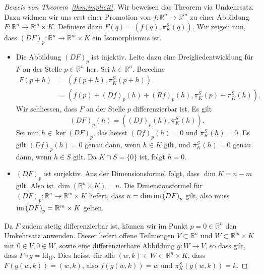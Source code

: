 \documentclass[../main.tex]{subfiles}
\begin{document}
\begin{proof}[Beweis von Theorem~\ref{thm:implicit}]
  Wir beweisen das Theorem via Umkehrsatz.
  Dazu widmen wir uns erst einer Promotion
  von $f \colon \mathbb{R}^n \to \mathbb{R}^m$ 
  zu einer Abbildung
  $F \colon \mathbb{R}^n \to \mathbb{R}^m \times K$.
  Definiere dazu $F(q) = (f(q), \pi_K^S(q))$.
  Wir zeigen nun, dass ${(DF)}_p \colon \mathbb{R}^n \to
  \mathbb{R}^m \times K$ 
  ein Isomorphismus ist.
  \begin{itemize}
    \item Die Abbildung ${(DF)}_p$
      ist injektiv.
      Leite dazu eine Dreigliedentwicklung für $F$ an
      der Stelle $p \in \mathbb{R}^n$ her.
      Sei $h \in \mathbb{R}^n$.
      Berechne
      \begin{align*}
        F(p+h)
        & = (f(p + h), \pi_K^S(p + h)) \\
        &= (f(p) + {(Df)}_p(h) + {(Rf)}_p(h), \pi_K^S(p) + \pi_K^S(h)).
      \end{align*}
      Wir schliessen, dass $F$
      an der Stelle  $p$ differenzierbar ist.
      Es gilt \[{(DF)}_p(h) = ({(Df)}_p(h), \pi_K^S(h)).\]
      Sei nun $h \in \ker {(DF)}_p$, das heisst
      ${(Df)}_p(h) = 0$ und $\pi_K^S(h) = 0$.
      Es gilt ${(Df)}_p(h) = 0$ genau dann,
      wenn $h \in K$ gilt, und $\pi_K^S(h) = 0$ genau dann,
      wenn $h \in S$ gilt. Da $K \cap S = \{0\}$ ist, folgt $h = 0$.
    \item ${(DF)}_p$ ist surjektiv.
      Aus der Dimensionsformel folgt, dass $\dim K = n - m$ gilt.
      Also ist $\dim (\mathbb{R}^n \times K) = n$.
      Die Dimensionsformel für 
      ${(DF)}_p \colon \mathbb{R}^n \to \mathbb{R}^m \times K$ 
      liefert, dass $n = \dim \operatorname{im} {(DF)}_p$ gilt, also muss
      $\operatorname{im} {(DF)}_p = \mathbb{R}^m \times K$ gelten.
  \end{itemize}
  Da $F$ zudem stetig differenzierbar ist,
  können wir im Punkt $p = 0 \in \mathbb{R}^n$ den Umkehrsatz anwenden.
  Dieser liefert offene Teilmengen
  $V \subset \mathbb{R}^n$ und $W \subset \mathbb{R}^m \times K$ 
  mit $0 \in V, 0 \in W$,
  sowie eine differenzierbare Abbildung $g \colon W \to V$,
  so dass gilt, dass $F \circ g = \text{Id}_W$.
  Dies heisst für alle $(w, k) \in W \subset \mathbb{R}^n \times K$,
  dass $F(g(w, k)) = (w, k)$, also
  $f(g(w, k)) = w$ 
  und $\pi_K^S(g(w, k)) = k$.


\end{proof}
\end{document}
